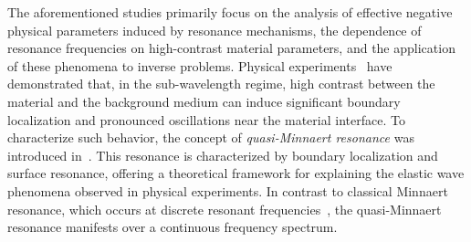 \documentclass[11pt,reqno,twoside]{amsart}
\theoremstyle{definition}
\theoremstyle{remark}
\numberwithin{equation}{section}
\begin{document}
The aforementioned studies primarily focus on the analysis of effective negative physical parameters induced by resonance mechanisms, the dependence of resonance frequencies on high-contrast material parameters, and the application of these phenomena to inverse problems. Physical experiments~\cite{LAI, LIUCHAN, LIUZHANG} have demonstrated that, in the sub-wavelength regime, high contrast between the material and the background medium can induce significant boundary localization and pronounced oscillations near the material interface. To characterize such behavior, the concept of \emph{quasi-Minnaert resonance} was introduced in~\cite{DTL}. This resonance is characterized by boundary localization and surface resonance, offering a theoretical framework for explaining the elastic wave phenomena observed in physical experiments. In contrast to classical Minnaert resonance, which occurs at discrete resonant frequencies~\cite{AFGL,lizou}, the quasi-Minnaert resonance manifests over a continuous frequency spectrum. 


\end{document}
